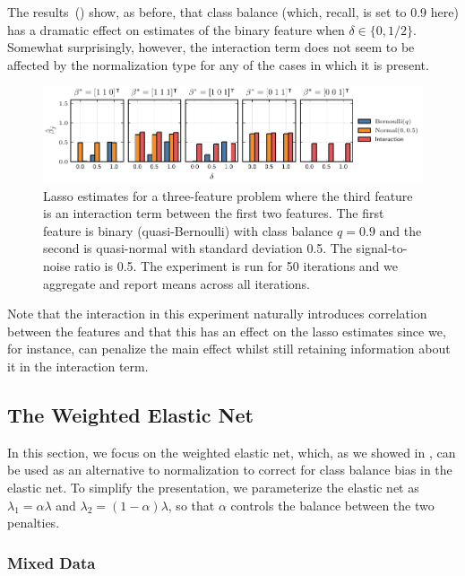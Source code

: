 The results~() show, as before, that class balance (which, recall,
is set to 0.9 here) has a dramatic effect on estimates of the binary feature when \(\delta
\in \{0, 1/2\}\). Somewhat surprisingly, however, the interaction term does not seem to be
affected by the normalization type for any of the cases in which it is present.

\begin{figure}[htpb]
  \label{fig:interactions}
  \centering
  \includegraphics[]{plots/interactions.pdf}
  \caption{%
    Lasso estimates for a three-feature problem where the third feature is an interaction term
    between the first two features. The first feature is binary (quasi-Bernoulli) with class
    balance \(q=0.9\) and the second is quasi-normal with standard deviation 0.5. The
    signal-to-noise ratio is 0.5. The experiment is run for 50 iterations and we aggregate and
    report means across all iterations. }
\end{figure}

Note that the interaction in this experiment naturally introduces correlation between the
features and that this has an effect on the lasso estimates since we, for instance, can
penalize the main effect whilst still retaining information about it in the interaction
term.

\subsection{The Weighted Elastic Net}\label{sec:experiments-elasticnet}

In this section, we focus on the weighted elastic net, which, as we showed in
, can be used as an alternative to normalization to correct
for class balance bias in the elastic net. To simplify the presentation, we parameterize
the elastic net as \(\lambda_1 = \alpha \lambda \) and \(\lambda_2 = (1-\alpha) \lambda\),
so that \(\alpha\) controls the balance between the two penalties.

\subsubsection{Mixed Data}\label{sec:experiments-mixed-data-elasticnet}

